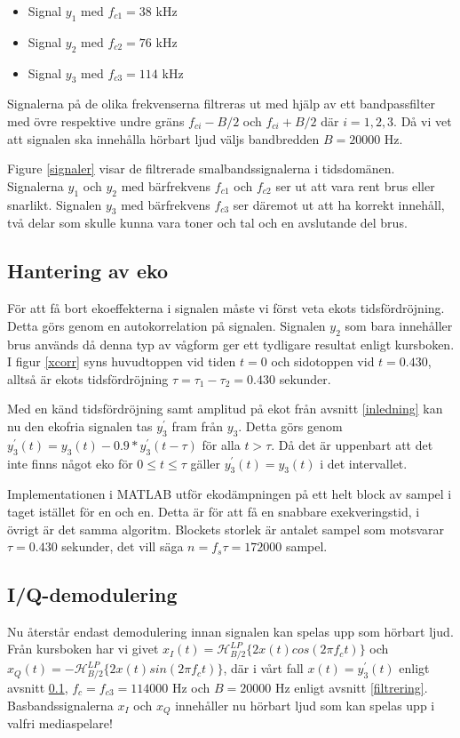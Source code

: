\documentclass[10pt]{article}
\begin{document}
\begin{multicols}{2}
\begin{itemize}
\item Signal $y_1$ med $f_{c1}=38$ kHz
\item Signal $y_2$ med $f_{c2}=76$ kHz
\item Signal $y_3$ med $f_{c3}=114$ kHz
\end{itemize}

Signalerna på de olika frekvenserna filtreras ut med hjälp av ett bandpassfilter med övre respektive undre gräns $f_{ci} - B/2$ och $f_{ci} + B/2$ där $i = 1,2,3$. Då vi vet att signalen ska innehålla hörbart ljud väljs bandbredden $B=20000$ Hz.


Figure \ref{signaler} visar de filtrerade smalbandssignalerna i tidsdomänen. Signalerna $y_1$ och $y_2$ med bärfrekvens $f_{c1}$ och $f_{c2}$ ser ut att vara rent brus eller snarlikt. Signalen $y_3$ med bärfrekvens $f_{c3}$ ser däremot ut att ha korrekt innehåll, två delar som skulle kunna vara toner och tal och en avslutande del brus.

\subsection{Hantering av eko} \label{eko}
För att få bort ekoeffekterna i signalen måste vi först veta ekots tidsfördröjning. Detta görs genom en autokorrelation på signalen. Signalen $y_2$ som bara innehåller brus används då denna typ av vågform ger ett tydligare resultat enligt kursboken. I figur \ref{xcorr} syns huvudtoppen vid tiden $t = 0$ och sidotoppen vid $t = 0.430$, alltså är ekots tidsfördröjning $\tau = \tau_{1} - \tau_{2} = 0.430$ sekunder.

Med en känd tidsfördröjning samt amplitud på ekot från avsnitt \ref{inledning} kan nu den ekofria signalen tas $y_{3}^{'}$ fram från $y_3$. Detta görs genom $y_{3}^{'}(t) = y_{3}(t) - 0.9*y_{3}^{'}(t - \tau)$ för alla $t > \tau$. Då det är uppenbart att det inte finns något eko för $0 \leq t \leq \tau$ gäller $y_{3}^{'}(t) = y_{3}(t)$ i det intervallet.

Implementationen i MATLAB utför ekodämpningen på ett helt block av sampel i taget istället för en och en. Detta är för att få en snabbare exekveringstid, i övrigt är det samma algoritm. Blockets storlek är antalet sampel som motsvarar $\tau = 0.430$ sekunder, det vill säga $n = f_s\tau = 172000$ sampel.

\subsection{I/Q-demodulering}
Nu återstår endast demodulering innan signalen kan spelas upp som hörbart ljud. Från kursboken har vi givet $x_I(t) = \mathcal{H}_{B/2}^{LP}\{2x(t)cos(2\pi f_ct)\}$ och $x_Q(t) = -\mathcal{H}_{B/2}^{LP}\{2x(t)sin(2\pi f_ct)\}$, där i vårt fall $x(t) = y_{3}^{'}(t)$ enligt avsnitt \ref{eko}, $f_c = f_{c3} = 114000$ Hz och $B = 20000$ Hz enligt avsnitt \ref{filtrering}. Basbandssignalerna $x_I$ och $x_Q$ innehåller nu hörbart ljud som kan spelas upp i valfri mediaspelare!


\end{multicols}
\end{document}
